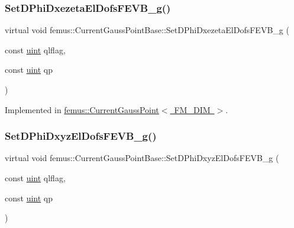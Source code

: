\mbox{\label{classfemus_1_1_current_gauss_point_base_af1e7dd520b7b288fc1ff02674745fbcd}} 
\subsubsection{\texorpdfstring{Set\+D\+Phi\+Dxezeta\+El\+Dofs\+F\+E\+V\+B\+\_\+g()}{SetDPhiDxezetaElDofsFEVB\_g()}}
{\footnotesize\ttfamily virtual void femus\+::\+Current\+Gauss\+Point\+Base\+::\+Set\+D\+Phi\+Dxezeta\+El\+Dofs\+F\+E\+V\+B\+\_\+g (\begin{DoxyParamCaption}\item[{const \mbox{\hyperlink{_typedefs_8hpp_a91ad9478d81a7aaf2593e8d9c3d06a14}{uint}}}]{qlflag,  }\item[{const \mbox{\hyperlink{_typedefs_8hpp_a91ad9478d81a7aaf2593e8d9c3d06a14}{uint}}}]{qp }\end{DoxyParamCaption})\hspace{0.3cm}{\ttfamily [pure virtual]}}



Implemented in \mbox{\hyperlink{classfemus_1_1_current_gauss_point_a5b7c118fc9376db8783714992e341891}{femus\+::\+Current\+Gauss\+Point$<$ F\+M\+\_\+\+D\+I\+M $>$}}.

\mbox{\label{classfemus_1_1_current_gauss_point_base_a119838d470a6e444ef0b54220b5dc3bc}} 
\subsubsection{\texorpdfstring{Set\+D\+Phi\+Dxyz\+El\+Dofs\+F\+E\+V\+B\+\_\+g()}{SetDPhiDxyzElDofsFEVB\_g()}}
{\footnotesize\ttfamily virtual void femus\+::\+Current\+Gauss\+Point\+Base\+::\+Set\+D\+Phi\+Dxyz\+El\+Dofs\+F\+E\+V\+B\+\_\+g (\begin{DoxyParamCaption}\item[{const \mbox{\hyperlink{_typedefs_8hpp_a91ad9478d81a7aaf2593e8d9c3d06a14}{uint}}}]{qlflag,  }\item[{const \mbox{\hyperlink{_typedefs_8hpp_a91ad9478d81a7aaf2593e8d9c3d06a14}{uint}}}]{qp }\end{DoxyParamCaption})\hspace{0.3cm}{\ttfamily [pure virtual]}}




